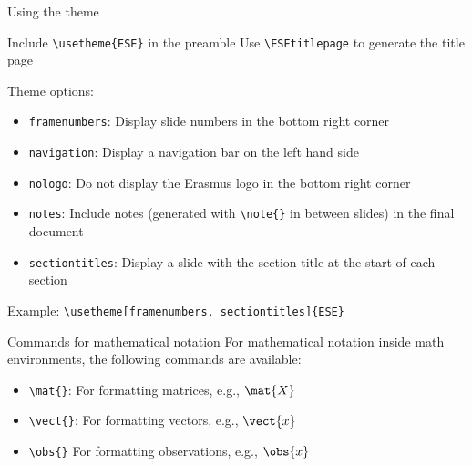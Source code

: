 \documentclass[pdfpagelabels=false, usepdftitle=false]{beamer}
\begin{document}
\begin{frame}[fragile]{Using the theme}
\vspace{-2ex}
\begin{itemize}
  \arrowitem Include \verb+\usetheme{ESE}+ in the preamble
  \arrowitem Use \verb+\ESEtitlepage+ to generate the title page
\end{itemize}

\vfill

\alert{Theme options}:
\begin{itemize}
  \item \verb+framenumbers+: Display slide numbers in the bottom right corner
  \item \verb+navigation+: Display a navigation bar on the left hand side
  \item \verb+nologo+: Do not display the Erasmus logo in the bottom right
  corner
  \item \verb+notes+: Include notes (generated with \verb+\note{}+ in between
  slides) in the final document
  \item \verb+sectiontitles+: Display a slide with the section title at the
  start of each section
\end{itemize}

\alert{Example}: \verb+\usetheme[framenumbers, sectiontitles]{ESE}+
\end{frame}


\begin{frame}[fragile]{Commands for mathematical notation}
For mathematical notation inside math environments, the following commands are
available:

\bigskip
\begin{itemize}
  \item \verb+\mat{}+: For formatting matrices, e.g., $\mat{X}$
  \medskip
  \item \verb+\vect{}+: For formatting vectors, e.g., $\vect{x}$
  \medskip
  \item \verb+\obs{}+ For formatting observations, e.g., $\obs{x}$
\end{itemize}
\end{frame}
\end{document}

